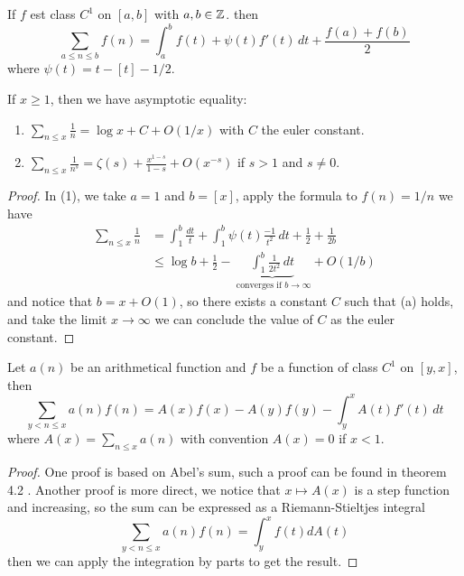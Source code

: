 \begin{theorem} \label{euler-maclaurin}
     If \(f\) est class \(C^1\) on \([a,b]\) with \(a,b \in \mathbb{Z}\). then 
    \[\sum_{a \leq n \leq b} f(n) = \int_a^{b}f(t) + \psi(t)f'(t) \,dt +\frac{f(a) + f(b)}{2}\]
where \(\psi(t) = t-[t]-1/2\).
    
\end{theorem}



\begin{colorexample}
    If \(x \geq 1\), then we have asymptotic equality:
    \begin{enumerate} [(1)]
        \item \(\sum_{n \leq x} \frac{1}{n}= \log x + C + O(1/x)\) with \(C\) the euler constant.
        \item \(\sum_{n \leq x} \frac{1}{n^s} = \zeta(s) + \frac{x^{1-s}}{1-s} + O(x^{-s})\) if \(s > 1\) and \(s \neq 0\).
    \end{enumerate}
\end{colorexample}

\begin{proof}
    In (1), we take \(a = 1\) and \(b  = [x]\), apply the formula to \(f(n) = 1/n\) we have
    \begin{align*}
        \sum_{n \leq x} \frac{1}{n} &= \int_{1}^b \frac{dt}{t} + \int_1^b \psi(t)\frac{-1}{t^2} \,dt + \frac{1}{2}+ \frac{1}{2b} \\
        &\leq \log b + \frac{1}{2} - \underbrace{\int_1^b \frac{1}{2t^2} \,dt}_{\text{ converges if } b \to \infty} + O(1/b)
    \end{align*}
    and notice that \(b = x + O(1)\), so there exists a constant \(C\) such that (a) holds, and take the limit \(x \to \infty\) we can conclude the value of \(C\) as the euler constant.
\end{proof}

\begin{theorem}[Abel]
    Let \(a(n)\) be an arithmetical function and \(f\) be a function of class \(C^1\) on \([y,x]\), then 
    \[\sum_{y < n \leq x} a(n)f(n) = A(x)f(x) - A(y)f(y) - \int_{y}^x A(t)f'(t) \,dt\] 
    where \(A(x) = \sum_{n \leq x}a(n)\) with convention \(A(x) = 0\) if \(x<1\).  
\end{theorem}

\begin{proof}
    One proof is based on Abel's sum, such a proof can be found in theorem 4.2 \cite{Apostol}. Another proof is more direct, we notice that \(x \mapsto A(x)\) is a step function and increasing, so the sum can be expressed as a Riemann-Stieltjes integral
    \[\sum_{y < n \leq x} a(n)f(n) = \int_{y}^x f(t) dA(t)\]
    then we can apply the integration by parts to get the result. 
\end{proof}

